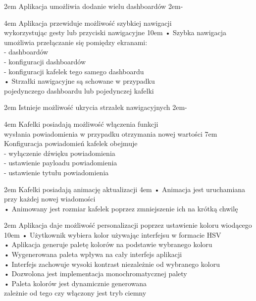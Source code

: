 {2em}{
    Aplikacja umożliwia dodanie wielu dashboardów
}
{2em}{-}

{4em}{
    Aplikacja przewiduje możliwość szybkiej nawigacji\\
    wykorzystując gesty lub przyciski nawigacyjne
}
{10em}{
    • Szybka nawigacja umożliwia przełączanie się pomiędzy ekranami:\\
    - dashboardów\\
    - konfiguracji dashboardów\\
    - konfiguracji kafelek tego samego dashboardu\\

    • Strzałki nawigacyjne są schowane w przypadku\\
    \hspace*{0.5em} pojedynczego dashboardu lub pojedynczej kafelki
}

{2em}{
    Istnieje możliwość ukrycia strzałek nawigacyjnych
}
{2em}{-}

{4em}{
    Kafelki posiadają możliwość włączenia funkcji\\
    wysłania powiadomienia w przypadku otrzymania nowej wartości
}
{7em}{
    Konfiguracja powiadomień kafelek obejmuje\\
    - wyłączenie dźwięku powiadomienia\\
    - ustawienie payloadu powiadomienia\\
    - ustawienie tytułu powiadomienia
}

{2em}{
    Kafelki posiadają animację aktualizacji
}
{4em}{
    • Animacja jest uruchamiana przy każdej nowej wiadomości\\
    • Animowany jest rozmiar kafelek poprzez zmniejszenie ich na krótką chwilę
}

{2em}{
    Aplikacja daje możliwość personalizacji poprzez ustawienie koloru wiodącego
}
{10em}{
    • Użytkownik wybiera kolor używając interfejsu w formacie HSV\\
    • Aplikacja generuje paletę kolorów na podstawie wybranego koloru\\
    • Wygenerowana paleta wpływa na cały interfejs aplikacji\\
    • Interfejs zachowuje wysoki kontrast niezależnie od wybranego koloru\\
    • Dozwolona jest implementacja monochromatycznej palety\\
    • Paleta kolorów jest dynamicznie generowana\\
    \hspace*{0.5em} zależnie od tego czy włączony jest tryb ciemny
}

